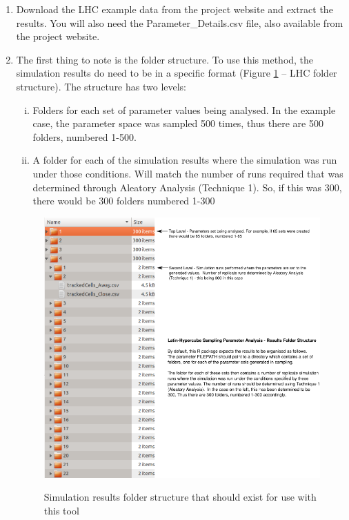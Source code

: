 \documentclass[a4paper,11pt]{article}
\begin{document}
\begin{enumerate}
\item Download the LHC example data from the project website and extract the results. You will also need the Parameter\_Details.csv file, also available from the project website.
\item The first thing to note is the folder structure.  To use this method, the simulation results do need to be in a specific format (Figure \ref{LHC_Folders} – LHC folder structure).  The structure has two levels:
\begin{enumerate}[(i)]
\item Folders for each set of parameter values being analysed. In the example case, the parameter space was sampled 500 times, thus there are 500 folders, numbered 1-500.
\item A folder for each of the simulation results where the simulation was run under those conditions. Will match the number of runs required that was determined through Aleatory Analysis (Technique 1). So, if this was 300, there would be 300 folders numbered 1-300
\end{enumerate}

\begin{figure}
\centering
    \includegraphics[width=\textwidth]{LHC_Folder_Struc.png}\\ \noindent
    \caption{Simulation results folder structure that should exist for use with this tool}
    \label{LHC_Folders}
    \newpage 
\end{figure}



\end{enumerate}
\end{document}
